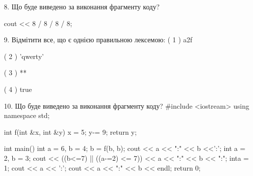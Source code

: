 \documentclass[11pt]{article}
\begin{document}
8. Що буде виведено за виконання фрагменту коду?

cout << 8 / 8 / 8 / 8;
\vspace{5mm}

9. %
Відмітити все, що є однією правильною лексемою:
( 1 ) a2f

( 2 ) 'qwerty'

( 3 ) **

( 4 ) true
\vspace{5mm}

10. Що буде виведено за виконання фрагменту коду?
#include <iostream>
using namespace std;

int f(int &x, int &y){
    x = 5;
    y-= 9;
    return y;
}

int main(){
    int a = 6, b = 4;
    b = f(b, b);
    cout << a << ":" << b <<':';
    {
        int a = 2, b = 3;
        cout << ((b<=7) || ((a-=2) <= 7))
             << a << ":" << b << ":";
    }
    {
        inta = 1;
        cout << a << ':';
    }
    cout << a << ":" << b << endl;
    return 0;
}

\vspace{5mm}

\newpage
\end{document}
